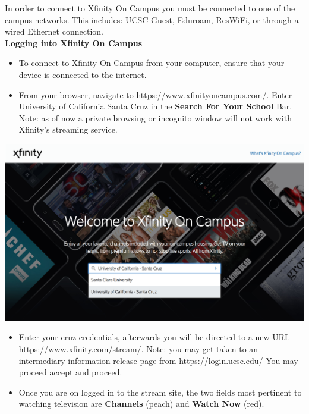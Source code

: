 \documentclass[a4paper, 11pt]{article}
\begin{document}
In order to connect to Xfinity On Campus you must be connected to one of the
campus networks.  This includes: UCSC-Guest, Eduroam, ResWiFi, or through a 
wired Ethernet connection.\\
{\newline}
\textbf{Logging into Xfinity On Campus}
\begin{itemize}
  \item To connect to Xfinity On Campus from your computer, ensure that your device  is connected to the internet. 
  \item From your browser, navigate to https://www.xfinityoncampus.com/.  Enter University of California Santa Cruz in the 
  \textbf{Search For Your School} Bar.
  Note: as of now a private browsing or incognito window will not work with
  Xfinity's streaming service.
\end{itemize}
\includegraphics[width=\linewidth, height=\textheight, keepaspectratio]{welcome.png}
\begin{itemize}
  \item Enter your cruz credentials, afterwards you will be directed to a new URL
  https://www.xfinity.com/stream/.  Note: you may get taken to an intermediary
  information release page from 
  https://login.ucsc.edu/  You may proceed accept and proceed.

  \item Once you are on logged in to the stream site, the two fields most
  pertinent to watching television are \textbf{Channels} (peach) and 
  \textbf{Watch Now}
  (red).
\end{itemize}
\end{document}
